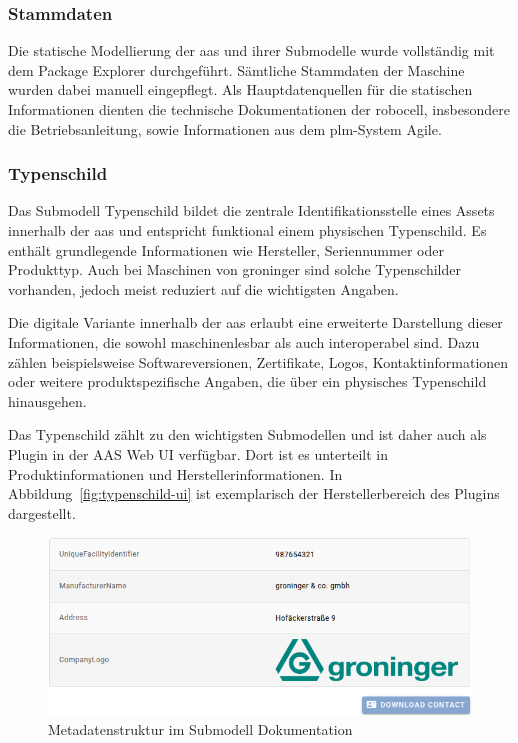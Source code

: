\subsubsection{Stammdaten}

Die statische Modellierung der \acs{aas} und ihrer Submodelle wurde vollständig mit dem Package Explorer durchgeführt. 
Sämtliche Stammdaten der Maschine wurden dabei manuell eingepflegt.
Als Hauptdatenquellen für die statischen Informationen dienten die technische Dokumentationen der robocell, insbesondere die Betriebsanleitung, sowie Informationen aus dem \acs{plm}-System Agile.

\subsubsection*{Typenschild}
\vspace{-0.5em}

Das Submodell Typenschild bildet die zentrale Identifikationsstelle eines Assets innerhalb der \acs{aas} und entspricht funktional einem physischen Typenschild. 
Es enthält grundlegende Informationen wie Hersteller, Seriennummer oder Produkttyp. 
Auch bei Maschinen von groninger sind solche Typenschilder vorhanden, jedoch meist reduziert auf die wichtigsten Angaben.

Die digitale Variante innerhalb der \acs{aas} erlaubt eine erweiterte Darstellung dieser Informationen, die sowohl maschinenlesbar als auch interoperabel sind. 
Dazu zählen beispielsweise Softwareversionen, Zertifikate, Logos, Kontaktinformationen oder weitere produktspezifische Angaben, die über ein physisches Typenschild hinausgehen. 

Das Typenschild zählt zu den wichtigsten Submodellen und ist daher auch als Plugin in der AAS Web UI verfügbar. 
Dort ist es unterteilt in Produktinformationen und Herstellerinformationen. 
In Abbildung~\ref{fig:typenschild-ui} ist exemplarisch der Herstellerbereich des Plugins dargestellt.

\begin{figure}[htbp]
    \centering
        \includegraphics[width=1\textwidth]{Bilder/Ergebnisse/StatischeDaten/Typenschildisualisierung.png}
    \caption{Metadatenstruktur im Submodell Dokumentation}
    \label{fig:Doku}
\end{figure}

